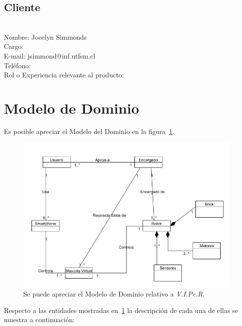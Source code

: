 \documentclass[letterpaper,12pt]{article} %
\numberwithin{equation}{section} %
\numberwithin{figure}{section} %
\numberwithin{table}{section} %
\begin{document}
\subsection{Cliente}
~\\
Nombre: Jocelyn Simmonds\\
Cargo: \\
E-mail: jsimmond@inf.utfsm.cl\\
Tel\'efono: \\
Rol o Experiencia relevante al producto:

\newpage
\section{Modelo de Dominio}

Es posible apreciar el Modelo del Dominio en la figura~\ref{fig:ModeloDominio}.

\begin{figure}[H]
   \centering
     \includegraphics[scale=0.7]{ModeloDominio.jpg}
   \caption{Se puede apreciar el Modelo de Dominio relativo a \emph{V.I.Pe.R}.}
   \label{fig:ModeloDominio}
\end{figure}

Respecto a las entidades mostradas en~\ref{fig:ModeloDominio} la descripci\'on de cada una de ellas se muestra a continuaci\'on:\\
\end{document}
